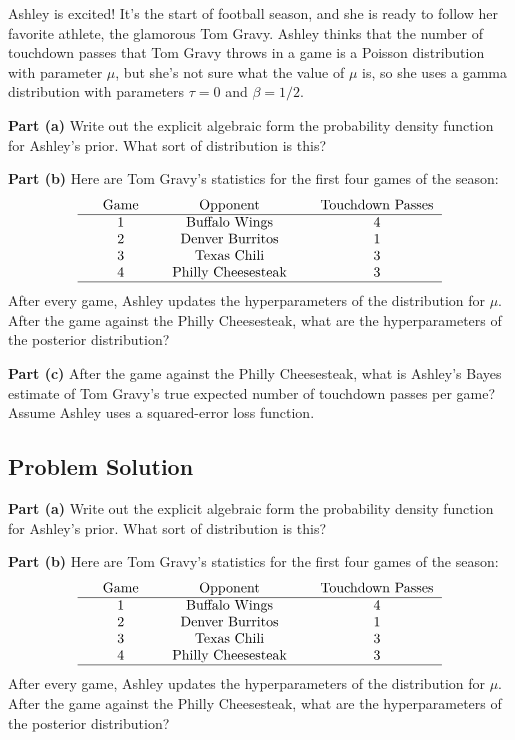 \documentclass[12pt]{article}
\theoremstyle{definition}
\begin{document}
Ashley is excited! It's the start of football season, and she is ready to follow her favorite athlete, the glamorous Tom Gravy. Ashley thinks that the number of touchdown passes that Tom Gravy throws in a game is a Poisson distribution with parameter $\mu$, but she's not sure what the value of $\mu$ is, so she uses a gamma distribution with parameters $\tau = 0$ and $\beta = 1/2$.

\bigskip
\noindent
{\bf Part (a)} Write out the explicit algebraic form the probability density function for Ashley's prior. What sort of distribution is this?

\bigskip
\noindent
{\bf Part (b)} Here are Tom Gravy's statistics for the first four games of the season:
$$
\begin{tabular}{ccccccc}
& Game & & Opponent & & Touchdown Passes\\
\hline
& 1 & & Buffalo Wings & & 4\\
& 2 & & Denver Burritos & & 1\\
& 3 & & Texas Chili & & 3\\
& 4 & & Philly Cheesesteak & & 3\\
\hline
\end{tabular}
$$
After every game, Ashley updates the hyperparameters of the distribution for $\mu$. After the game against the Philly Cheesesteak, what are the hyperparameters of the posterior distribution?

\bigskip
\noindent
{\bf Part (c)} After the game against the Philly Cheesesteak, what is Ashley's Bayes estimate of Tom Gravy's true expected number of touchdown passes per game? Assume Ashley uses a squared-error loss function.

\newpage
\subsection*{Problem Solution}

\noindent
{\bf Part (a)} Write out the explicit algebraic form the probability density function for Ashley's prior. What sort of distribution is this?

\vspace{2in}
\noindent
{\bf Part (b)} Here are Tom Gravy's statistics for the first four games of the season:
$$
\begin{tabular}{ccccccc}
& Game & & Opponent & & Touchdown Passes\\
\hline
& 1 & & Buffalo Wings & & 4\\
& 2 & & Denver Burritos & & 1\\
& 3 & & Texas Chili & & 3\\
& 4 & & Philly Cheesesteak & & 3\\
\hline
\end{tabular}
$$
After every game, Ashley updates the hyperparameters of the distribution for $\mu$. After the game against the Philly Cheesesteak, what are the hyperparameters of the posterior distribution?
 
\end{document}

